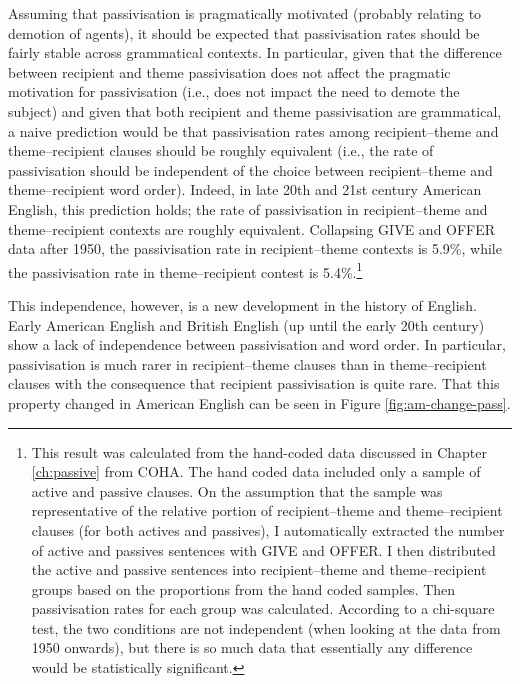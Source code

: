 	Assuming that passivisation is pragmatically motivated (probably relating to demotion of agents), it should be expected that passivisation rates should be fairly stable across grammatical contexts. In particular, given that the difference between recipient and theme passivisation does not affect the pragmatic motivation for passivisation (i.e., does not impact the need to demote the subject) and given that both recipient and theme passivisation are grammatical, a naive prediction would be that passivisation rates among recipient--theme and theme--recipient clauses should be roughly equivalent (i.e., the rate of passivisation should be independent of the choice between recipient--theme and theme--recipient word order). Indeed, in late 20th and 21st century American English, this prediction holds; the rate of passivisation in recipient--theme and theme--recipient contexts are roughly equivalent. Collapsing GIVE and OFFER data after 1950, the passivisation rate in recipient--theme contexts is 5.9\%, while the passivisation rate in theme--recipient contest is 5.4\%.\footnote{This result was calculated from the hand-coded data discussed in Chapter \ref{ch:passive} from COHA. The hand coded data included only a sample of active and passive clauses. On the assumption that the sample was representative of the relative portion of recipient--theme and theme--recipient clauses (for both actives and passives), I automatically extracted the number of active and passives sentences with GIVE and OFFER. I then distributed the active and passive sentences into recipient--theme and theme--recipient groups based on the proportions from the hand coded samples. Then passivisation rates for each group was calculated. According to a chi-square test, the two conditions are not independent (when looking at the data from 1950 onwards), but there is so much data that essentially any difference would be statistically significant.}
	
	This independence, however, is a new development in the history of English. Early American English and British English (up until the early 20th century) show a lack of independence between passivisation and word order. In particular, passivisation is much rarer in recipient--theme clauses than in theme--recipient clauses with the consequence that recipient passivisation is quite rare. That this property changed in American English can be seen in Figure \ref{fig:am-change-pass}.


